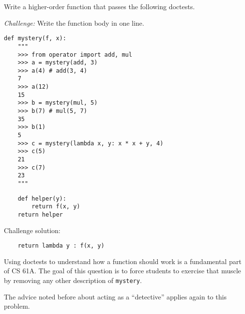 \begin{blocksection}
\question Write a higher-order function that passes the following doctests.

\emph{Challenge:} Write the function body in one line.

\begin{lstlisting}
def mystery(f, x):
    """
    >>> from operator import add, mul
    >>> a = mystery(add, 3)
    >>> a(4) # add(3, 4)
    7
    >>> a(12)
    15
    >>> b = mystery(mul, 5)
    >>> b(7) # mul(5, 7)
    35
    >>> b(1)
    5
    >>> c = mystery(lambda x, y: x * x + y, 4)
    >>> c(5)
    21
    >>> c(7)
    23
    """
\end{lstlisting}

\begin{solution}[1in]
\begin{lstlisting}
    def helper(y):
        return f(x, y)
    return helper
\end{lstlisting}

Challenge solution:

\begin{lstlisting}
    return lambda y : f(x, y)
\end{lstlisting}
\end{solution}
\end{blocksection}

\begin{questionmeta}
    Using doctests to understand how a function should work is a fundamental part of CS 61A. The goal of this question is to force students to exercise that muscle by removing any other description of \lstinline{mystery}. 

    The advice noted before about acting as a ``detective'' applies again to this problem. 
\end{questionmeta}